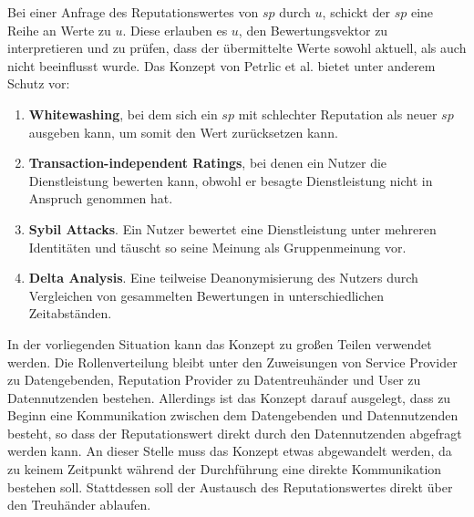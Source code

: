 \documentclass[
	fontsize=12pt,
	headings=small,
	parskip=half,           %
	bibliography=totoc,
	numbers=noenddot,       %
	open=any,               %
]{scrreprt}
\begin{document}
Bei einer Anfrage des Reputationswertes von $sp$ durch $u$, schickt der $sp$ eine Reihe an Werte zu $u$. Diese erlauben es $u$, den Bewertungsvektor zu interpretieren und zu prüfen, dass der übermittelte Werte sowohl aktuell, als auch nicht beeinflusst wurde. 
Das Konzept von Petrlic et al. bietet unter anderem Schutz vor: 
\begin{enumerate}
    \item \textbf{Whitewashing}, bei dem sich ein $sp$ mit schlechter Reputation als neuer $sp$ ausgeben kann, um somit den Wert zurücksetzen kann.
    \item \textbf{Transaction-independent Ratings}, bei denen ein Nutzer die Dienstleistung bewerten kann, obwohl er besagte Dienstleistung nicht in Anspruch genommen hat.
    \item \textbf{Sybil Attacks}. Ein Nutzer bewertet eine Dienstleistung unter mehreren Identitäten und täuscht so seine Meinung als Gruppenmeinung vor.
    \item \textbf{Delta Analysis}. Eine teilweise Deanonymisierung des Nutzers durch Vergleichen von gesammelten Bewertungen in unterschiedlichen Zeitabständen.
\end{enumerate} 
In der vorliegenden Situation kann das Konzept zu großen Teilen verwendet werden. Die Rollenverteilung bleibt unter den Zuweisungen von Service Provider zu Datengebenden, Reputation Provider zu Datentreuhänder und User zu Datennutzenden bestehen. Allerdings ist das Konzept darauf ausgelegt, dass zu Beginn eine Kommunikation zwischen dem Datengebenden und Datennutzenden besteht, so dass der Reputationswert direkt durch den Datennutzenden abgefragt werden kann. An dieser Stelle muss das Konzept etwas abgewandelt werden, da zu keinem Zeitpunkt während der Durchführung eine direkte Kommunikation bestehen soll. Stattdessen soll der Austausch des Reputationswertes direkt über den Treuhänder ablaufen.
\end{document}
